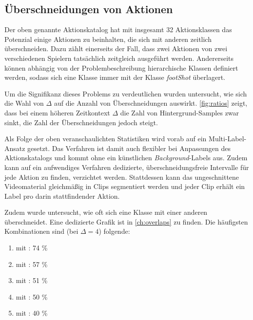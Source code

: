 \subsection{Überschneidungen von Aktionen}
\label{sec:multi-label}

Der oben genannte Aktionskatalog hat mit insgesamt 32 Aktionsklassen das Potenzial einige Aktionen zu beinhalten, die sich mit anderen zeitlich überschneiden.
Dazu zählt einerseits der Fall, dass zwei Aktionen von zwei verschiedenen Spielern tatsächlich zeitgleich ausgeführt werden.
Andererseits können abhängig von der Problembeschreibung \zB hierarchische Klassen definiert werden, sodass sich eine Klasse  immer mit der Klasse \emph{footShot} überlagert.

Um die Signifikanz dieses Problems zu verdeutlichen wurden untersucht, wie sich die Wahl von $\Delta$ auf die Anzahl von Überschneidungen auswirkt.
\autoref{fig:ratios} zeigt, dass bei einem höheren Zeitkontext $\Delta$ die Zahl von Hintergrund-Samples zwar sinkt, die Zahl der Überschneidungen jedoch steigt.

Als Folge der oben veranschaulichten Statistiken wird vorab auf ein Multi-Label-Ansatz gesetzt.
Das Verfahren ist damit auch flexibler bei Anpassungen des Aktionskatalogs und kommt ohne ein künstlichen \emph{Background}-Labels aus.
Zudem kann auf ein aufwendiges Verfahren dedizierte, überschneidungsfreie Intervalle für jede Aktion zu finden, verzichtet werden.
Stattdessen kann das ungeschnittene Videomaterial gleichmäßig in Clips segmentiert werden und jeder Clip erhält ein Label pro darin stattfindender Aktion.

Zudem wurde untersucht, wie oft sich eine Klasse mit einer anderen überschneidet.
Eine dedizierte Grafik ist in \autoref{ch:overlaps} zu finden.
Die häufigsten Kombinationen sind (bei $\Delta=4$) folgende:

\begin{enumerate}
    \item {} mit : 74 \%
    \item {} mit : 57 \%
    \item {} mit : 51 \%
    \item {} mit : 50 \%
    \item {} mit : 40 \%
\end{enumerate}


